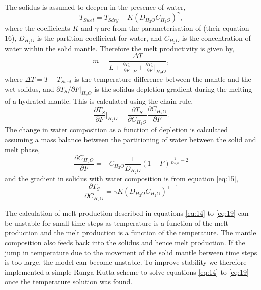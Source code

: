 \documentclass[draft,grl]{agutexSI2018}
\begin{document}
\begin{article}
The solidus is assumed to deepen in the presence of water,
\begin{equation}
T_{Swet} = T_{Sdry} + K\left(D_{H_{2}O}C_{H_{2}O}\right)^{\gamma},
\label{eq:15}
\end{equation}
where the coefficients $K$ and $\gamma$ are from the parameterisation of \citet{katz-etal-2003} (their equation 16), $D_{H_{2}O}$ is the partition coefficient for water, and $C_{H_{2}O}$ is the concentration of water within the solid mantle. Therefore the melt productivity is given by,
\begin{equation}
m = \frac{\Delta T}{L + \frac{\partial T_{S}}{\partial F}\vert_{P} + \frac{\partial T_{S}}{\partial F}\vert_{H_{2}O}},
\label{eq:16}
\end{equation}
where $\Delta T = T-T_{Swet}$ is the temperature difference between the mantle and the wet solidus, and $\partial T_{S}/\partial F\vert_{H_{2}O}$ is the solidus depletion gradient during the melting of a hydrated mantle. This is calculated using the chain rule,
\begin{equation}
\frac{\partial T_{S}}{\partial F}\vert_{H_{2}O} = \frac{\partial T_{S}}{\partial C_{H_{2}O}} \frac{\partial C_{H_{2}O}}{\partial F}.
\label{eq:17}
\end{equation}
The change in water composition as a function of depletion is calculated assuming a mass balance between the partitioning of water between the solid and melt phase,
\begin{equation}
\frac{\partial C_{H_{2}O}}{\partial F} = -C_{H_{2}O} \frac{1}{D_{H_{2}O}}\left(1-F\right)^{\frac{1}{D_{H_{2}O}}-2}
\label{eq:18}
\end{equation}
and the gradient in solidus with water composition is from equation \ref{eq:15},
\begin{equation}
\frac{\partial T_{S}}{\partial C_{H_{2}O}} = \gamma K\left(D_{H_{2}O}C_{H_{2}O}\right)^{\gamma-1}
\label{eq:19}
\end{equation}

The calculation of melt production described in equations \ref{eq:14} to \ref{eq:19} can be unstable for small time steps as temperature is a function of the melt production and the melt production is a function of the temperature. The mantle composition also feeds back into the solidus and hence melt production. If the jump in temperature due to the movement of the solid mantle between time steps is too large, the model can become unstable. To improve stability we therefore implemented a simple Runga Kutta scheme to solve equations \ref{eq:14} to \ref{eq:19} once the temperature solution was found.


\end{article}
\end{document}
